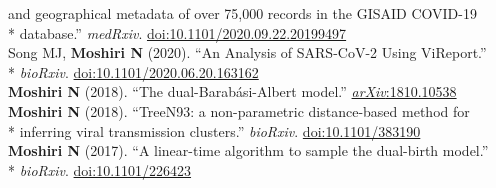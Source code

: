 \documentclass[margin,line]{res}
\begin{document}
\begin{resume}
\hspace*{9mm} and geographical metadata of over 75,000 records in the GISAID COVID-19\\*\vspace{2mm}
\hspace*{8mm} database.'' \textit{medRxiv}. \href{https://doi.org/10.1101/2020.09.22.20199497}{doi:10.1101/2020.09.22.20199497}\\
\hspace*{4mm} Song MJ, \textbf{Moshiri N} (2020). ``An Analysis of SARS-CoV-2 Using ViReport.''\\*\vspace{2mm}
\hspace*{8mm} \textit{bioRxiv}. \href{https://doi.org/10.1101/2020.06.20.163162}{doi:10.1101/2020.06.20.163162}\\
\hspace*{4mm} \vspace{2mm}\textbf{Moshiri N} (2018). ``The dual-Barab\'asi-Albert model.'' \href{https://arxiv.org/abs/1810.10538}{\textit{arXiv}:1810.10538}\\
\hspace*{4mm} \textbf{Moshiri N} (2018). ``TreeN93: a non-parametric distance-based method for\\*\vspace{2mm}
\hspace*{8mm} inferring viral transmission clusters.'' \textit{bioRxiv}. \href{https://doi.org/10.1101/383190}{doi:10.1101/383190}\\
\hspace*{4mm} \textbf{Moshiri N} (2017). ``A linear-time algorithm to sample the dual-birth model.''\\*\vspace{2mm}
\hspace*{8mm} \textit{bioRxiv}. \href{https://doi.org/10.1101/226423}{doi:10.1101/226423}\\


\end{resume}
\end{document}
